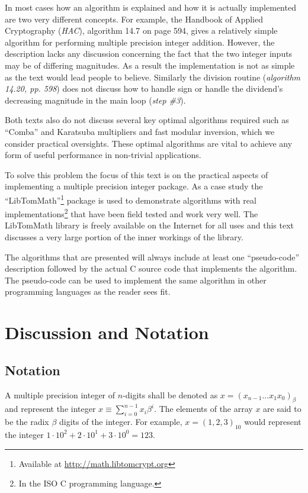 \documentclass[b5paper]{book}
\begin{document}
In most cases how an algorithm is explained and how it is actually implemented are two very different concepts.  For 
example, the Handbook of Applied Cryptography (\textit{HAC}), algorithm 14.7 on page 594, gives a relatively simple 
algorithm for performing multiple precision integer addition.  However, the description lacks any discussion concerning 
the fact that the two integer inputs may be of differing magnitudes.  As a result the implementation is not as simple
as the text would lead people to believe.  Similarly the division routine (\textit{algorithm 14.20, pp. 598}) does not 
discuss how to handle sign or handle the dividend's decreasing magnitude in the main loop (\textit{step \#3}).

Both texts also do not discuss several key optimal algorithms required such as ``Comba'' and Karatsuba multipliers 
and fast modular inversion, which we consider practical oversights.  These optimal algorithms are vital to achieve 
any form of useful performance in non-trivial applications.  

To solve this problem the focus of this text is on the practical aspects of implementing a multiple precision integer
package.  As a case study the ``LibTomMath''\footnote{Available at \url{http://math.libtomcrypt.org}} package is used 
to demonstrate algorithms with real implementations\footnote{In the ISO C programming language.} that have been field 
tested and work very well.  The LibTomMath library is freely available on the Internet for all uses and this text 
discusses a very large portion of the inner workings of the library.

The algorithms that are presented will always include at least one ``pseudo-code'' description followed 
by the actual C source code that implements the algorithm.  The pseudo-code can be used to implement the same 
algorithm in other programming languages as the reader sees fit.  

\section{Discussion and Notation}
\subsection{Notation}
A multiple precision integer of $n$-digits shall be denoted as $x = (x_{n-1} ... x_1 x_0)_{ \beta }$ and represent
the integer $x \equiv \sum_{i=0}^{n-1} x_i\beta^i$.  The elements of the array $x$ are said to be the radix $\beta$ digits 
of the integer.  For example, $x = (1,2,3)_{10}$ would represent the integer 
$1\cdot 10^2 + 2\cdot10^1 + 3\cdot10^0 = 123$.  
\end{document}
